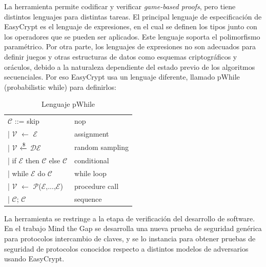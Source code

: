 \documentclass[runningheads]{llncs}
\begin{document}
La herramienta permite codificar y verificar \textit{game-based proofs}, pero tiene distintos lenguajes para distintas tareas. El principal lenguaje de especificación de EasyCrypt es el lenguaje de expresiones, en el cual se definen los tipos junto con los operadores que se pueden ser aplicados. Este lenguaje soporta el polimorfismo paramétrico. Por otra parte, los lenguajes de expresiones no son adecuados para definir juegos y otras estructuras de datos como esquemas criptográficos y oráculos, debido a la naturaleza dependiente del estado previo de los algoritmos secuenciales. Por eso EasyCrypt usa un lenguaje diferente, llamado pWhile\cite{ref_book1} (probabilistic while) para definirlos:

\begin{table}[H]
  \setlength{\tabcolsep}{12pt}
  \caption{Lenguaje pWhile}
  \label{tab:simple}
  \centering
  \begin{tabular}{ll}
    \toprule
    $\mathcal{C}$ ::= skip & nop\\
    \hspace{0.5cm}| $\mathcal{V}$	$\xleftarrow{}$ $\mathcal{E}$ & assignment\\
    \hspace{0.5cm}| $\mathcal{V}$ $\xleftarrow{\text{\textdollar}}$ $\mathcal{D}$$\mathcal{E}$ & random sampling\\
    \hspace{0.5cm}| if $\mathcal{E}$ then $\mathcal{C}$ else $\mathcal{C}$ & conditional\\
    \hspace{0.5cm}| while $\mathcal{E}$ do $\mathcal{C}$ & while loop\\
    \hspace{0.5cm}| $\mathcal{V}$	$\xleftarrow{}$ $\mathcal{P}$($\mathcal{E}$,...,$\mathcal{E}$) & procedure call\\
    \hspace{0.5cm}| $\mathcal{C}$; $\mathcal{C}$ & sequence\\
    \bottomrule
  \end{tabular}
\end{table}


La herramienta se restringe a la etapa de verificación del desarrollo de software. En el trabajo Mind the Gap\cite{ref_article2} se desarrolla una nueva prueba de seguridad genérica para protocolos intercambio de claves, y se lo instancia para obtener pruebas de seguridad de protocolos conocidos respecto a distintos modelos de adversarios usando EasyCrypt.
\end{document}
